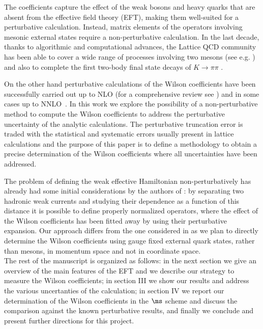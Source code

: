 \documentclass[aps,prd,twocolumn,nofootinbib,showpacs,superscriptaddress]{revtex4-1}
\begin{document}
The coefficients capture the effect of the weak bosons and heavy quarks 
that are absent from the 
effective field theory (EFT), making them well-suited for a perturbative calculation.
Instead, matrix elements of the operators involving mesonic external states require a 
non-perturbative calculation. In the last decade, thanks to algorithmic and computational
advances, the Lattice QCD community has been able to cover a wide range of processes
involving two mesons (see e.g. )
and also to complete the first two-body final state decays of $K \to \pi \pi$ 
\cite{Bai:2015nea, Blum:2011ng, Blum:2012uk, Blum:2015ywa}.

On the other hand perturbative calculations of the Wilson coefficients have been successfully carried 
out up to NLO (for a comprehensive review see ) 
and in some cases up to NNLO~\cite{Gorbahn:2004my}.
In this work we explore the possibility of a non-perturbative 
method to compute the Wilson coefficients to 
address the perturbative uncertainty of the analytic calculations.
The perturbative truncation error 
is traded with the statistical and systematic errors usually present in lattice 
calculations
and the purpose of this paper is to define a methodology to obtain a precise determination of the
Wilson coefficients where all uncertainties have been addressed.

The problem of defining the weak effective Hamiltonian non-perturbatively 
has already had some initial considerations by the authors of :
by separating two hadronic weak currents and studying their dependence as 
a function of this distance it is possible to define 
properly normalized operators, where the effect of the Wilson coefficients has been 
fitted away by using their perturbative expansion. 
Our approach differs from the one considered in  as we 
plan to directly determine the Wilson coefficients using gauge fixed 
external quark states, rather than mesons, 
in momentum space and not in coordinate space.\\

The rest of the manuscript is organized as follows: in the next
section we give an overview of the main features of the EFT and we describe
our strategy to measure the Wilson coefficients; in section III 
we show our results and address the various uncertanties of the
calculation; in section IV we report our determination of the Wilson coefficients
in the $\ms$ scheme and discuss the comparison against the known perturbative results, 
and finally we conclude and present further directions for this project.
\end{document}
